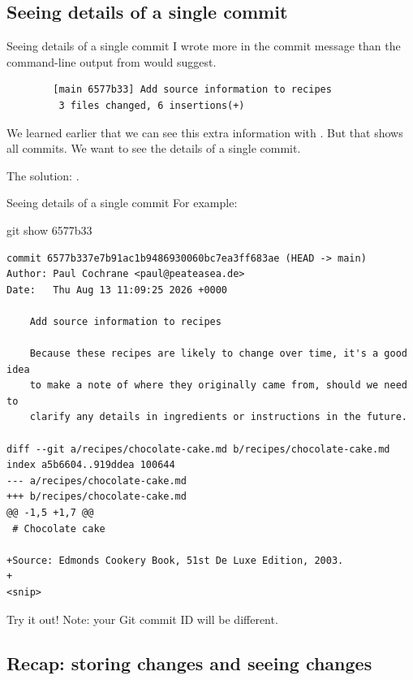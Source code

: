 \subsection{Seeing details of a single commit}

\begin{frame}[fragile]{Seeing details of a single commit}
    I wrote more in the commit message than the command-line output from
     would suggest.

    \begin{verbatim}
        [main 6577b33] Add source information to recipes
         3 files changed, 6 insertions(+)
    \end{verbatim}

    We learned earlier that we can see this extra information with .  But that shows all commits.  We want to see the details of a
    single commit.

    The solution: .
\end{frame}

\begin{frame}[fragile]{Seeing details of a single commit}
    For example:
    \begin{shellcode}
        git show 6577b33
    \end{shellcode}
    \begin{verbatim}
commit 6577b337e7b91ac1b9486930060bc7ea3ff683ae (HEAD -> main)
Author: Paul Cochrane <paul@peateasea.de>
Date:   Thu Aug 13 11:09:25 2026 +0000

    Add source information to recipes

    Because these recipes are likely to change over time, it's a good idea
    to make a note of where they originally came from, should we need to
    clarify any details in ingredients or instructions in the future.

diff --git a/recipes/chocolate-cake.md b/recipes/chocolate-cake.md
index a5b6604..919ddea 100644
--- a/recipes/chocolate-cake.md
+++ b/recipes/chocolate-cake.md
@@ -1,5 +1,7 @@
 # Chocolate cake

+Source: Edmonds Cookery Book, 51st De Luxe Edition, 2003.
+
<snip>
    \end{verbatim}
    Try it out!  Note: your Git commit ID will be different.
\end{frame}

\subsection{Recap: storing changes and seeing changes}

